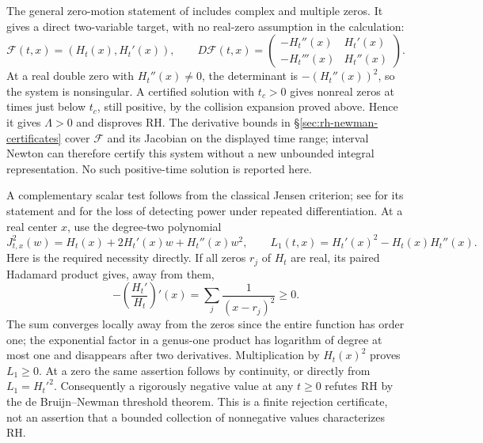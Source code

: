 The general zero-motion statement of \cite[\S3]{polymath2019}
includes complex and multiple zeros. It gives a direct two-variable
target, with no real-zero assumption in the calculation:
\begin{equation}
 \mathcal F(t,x)=(H_t(x),H_t'(x)),\qquad
 D\mathcal F(t,x)=
 \begin{pmatrix}-H_t''(x)&H_t'(x)\\-H_t'''(x)&H_t''(x)\end{pmatrix}.
 \label{eq:rh-collision-jacobian}
\end{equation}
At a real double zero with $H_t''(x)\ne0$, the determinant is
$-(H_t''(x))^2$, so the system is nonsingular. A certified solution
with $t_c>0$ gives nonreal zeros at times just below $t_c$, still
positive, by the collision expansion proved above. Hence it gives
$\Lambda>0$ and disproves RH. The derivative bounds in
\S\ref{sec:rh-newman-certificates} cover $\mathcal F$ and its
Jacobian on the displayed time range; interval Newton can therefore
certify this system without a new unbounded integral representation.
No such positive-time solution is reported here.

A complementary scalar test follows from the classical Jensen
criterion; see \cite[\S2 and \S4.2]{farmer2020jensen} for its statement
and for the loss of detecting power under repeated differentiation.
At a real center $x$, use the degree-two polynomial
\begin{equation}
 J^2_{t,x}(w)=H_t(x)+2H_t'(x)w+H_t''(x)w^2,\qquad
 L_1(t,x)=H_t'(x)^2-H_t(x)H_t''(x).
 \label{eq:rh-centered-laguerre}
\end{equation}
Here is the required necessity directly. If all zeros $r_j$ of
$H_t$ are real, its paired Hadamard product gives, away from them,
\[
 -\left(\frac{H_t'}{H_t}\right)'(x)
   =\sum_j\frac{1}{(x-r_j)^2}\ge0.
\]
The sum converges locally away from the zeros since the entire
function has order one; the exponential factor in a genus-one
product has logarithm of degree at most one and disappears after
two derivatives. Multiplication by $H_t(x)^2$ proves $L_1\ge0$.
At a zero the same assertion follows by continuity, or directly
from $L_1=H_t'^2$. Consequently a rigorously negative value at any
$t\ge0$ refutes RH by the de Bruijn--Newman threshold theorem.
This is a finite rejection certificate, not an assertion that a
bounded collection of nonnegative values characterizes RH.

